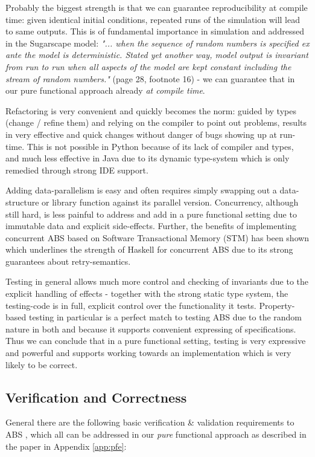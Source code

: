 Probably the biggest strength is that we can guarantee reproducibility at compile time: given identical initial conditions, repeated runs of the simulation will lead to same outputs. This is of fundamental importance in simulation and addressed in the Sugarscape model: \textit{"... when the sequence of random numbers is specified ex ante the model is deterministic. Stated yet another way, model output is invariant from run to run when all aspects of the model are kept constant including the stream of random numbers."} (page 28, footnote 16) - we can guarantee that in our pure functional approach already \textit{at compile time}.

Refactoring is very convenient and quickly becomes the norm: guided by types (change / refine them) and relying on the compiler to point out problems, results in very effective and quick changes without danger of bugs showing up at run-time. This is not possible in Python because of its lack of compiler and types, and much less effective in Java due to its dynamic type-system which is only remedied through strong IDE support.

Adding data-parallelism is easy and often requires simply swapping out a data-structure or library function against its parallel version. Concurrency, although still hard, is less painful to address and add in a pure functional setting due to immutable data and explicit side-effects. Further, the benefits of implementing concurrent ABS based on Software Transactional Memory (STM) has been shown \cite{thaler_tale_2018} which underlines the strength of Haskell for concurrent ABS due to its strong guarantees about retry-semantics.

Testing in general allows much more control and checking of invariants due to the explicit handling of effects - together with the strong static type system, the testing-code is in full, explicit control over the functionality it tests. Property-based testing in particular is a perfect match to testing ABS due to the random nature in both and because it supports convenient expressing of specifications. Thus we can conclude that in a pure functional setting, testing is very expressive and powerful and supports working towards an implementation which is very likely to be correct.


\subsection{Verification and Correctness}
General there are the following basic verification \& validation requirements to ABS \cite{robinson_simulation:_2014}, which all can be addressed in our \textit{pure} functional approach as described in the paper in Appendix \ref{app:pfe}:

